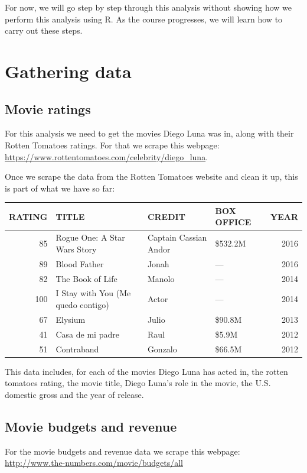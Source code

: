 \documentclass[12pt,]{book}
\theoremstyle{definition}
\theoremstyle{definition}
\theoremstyle{definition}
\theoremstyle{remark}
\begin{document}
For now, we will go step by step through this analysis without showing
how we perform this analysis using R. As the course progresses, we will
learn how to carry out these steps.

\section{Gathering data}\label{gathering-data}

\subsection{Movie ratings}\label{movie-ratings}

For this analysis we need to get the movies Diego Luna was in, along
with their Rotten Tomatoes ratings. For that we scrape this webpage:
\url{https://www.rottentomatoes.com/celebrity/diego_luna}.

Once we scrape the data from the Rotten Tomatoes website and clean it
up, this is part of what we have so far:

\begin{tabular}{r|l|l|l|r}
\hline
RATING & TITLE & CREDIT & BOX OFFICE & YEAR\\
\hline
85 & Rogue One: A Star Wars Story & Captain Cassian Andor & \$532.2M & 2016\\
\hline
89 & Blood Father & Jonah & — & 2016\\
\hline
82 & The Book of Life & Manolo & — & 2014\\
\hline
100 & I Stay with You (Me quedo contigo) & Actor & — & 2014\\
\hline
67 & Elysium & Julio & \$90.8M & 2013\\
\hline
41 & Casa de mi padre & Raul & \$5.9M & 2012\\
\hline
51 & Contraband & Gonzalo & \$66.5M & 2012\\
\hline
\end{tabular}

This data includes, for each of the movies Diego Luna has acted in, the
rotten tomatoes rating, the movie title, Diego Luna's role in the movie,
the U.S. domestic gross and the year of release.

\subsection{Movie budgets and revenue}\label{movie-budgets-and-revenue}

For the movie budgets and revenue data we scrape this webpage:
\url{http://www.the-numbers.com/movie/budgets/all}
\end{document}
